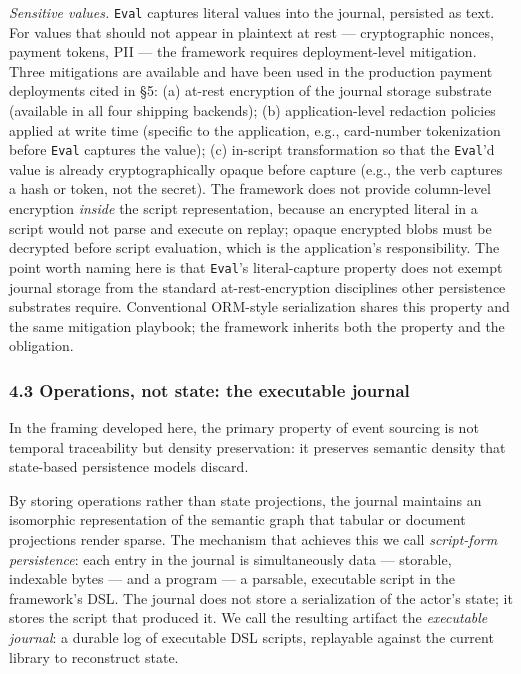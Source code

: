 \documentclass[
]{article}
\let\origtexttt\texttt%
\renewcommand{\texttt}[1]{\origtexttt{\seqsplit{#1}}}%
\let\texttt\origtexttt%
\begin{document}
\emph{Sensitive values.} \texttt{Eval} captures literal values into the
journal, persisted as text. For values that should not appear in
plaintext at rest --- cryptographic nonces, payment tokens, PII --- the
framework requires deployment-level mitigation. Three mitigations are
available and have been used in the production payment deployments cited
in §5: (a) at-rest encryption of the journal storage substrate
(available in all four shipping backends); (b) application-level
redaction policies applied at write time (specific to the application,
e.g., card-number tokenization before \texttt{Eval} captures the value);
(c) in-script transformation so that the \texttt{Eval}'d value is
already cryptographically opaque before capture (e.g., the verb captures
a hash or token, not the secret). The framework does not provide
column-level encryption \emph{inside} the script representation, because
an encrypted literal in a script would not parse and execute on replay;
opaque encrypted blobs must be decrypted before script evaluation, which
is the application's responsibility. The point worth naming here is that
\texttt{Eval}'s literal-capture property does not exempt journal storage
from the standard at-rest-encryption disciplines other persistence
substrates require. Conventional ORM-style serialization shares this
property and the same mitigation playbook; the framework inherits both
the property and the obligation.

\subsubsection{4.3 Operations, not state: the executable
journal}\label{operations-not-state-the-executable-journal}

In the framing developed here, the primary property of event sourcing is
not temporal traceability but density preservation: it preserves
semantic density that state-based persistence models discard.

By storing operations rather than state projections, the journal
maintains an isomorphic representation of the semantic graph that
tabular or document projections render sparse. The mechanism that
achieves this we call \emph{script-form persistence}: each entry in the
journal is simultaneously data --- storable, indexable bytes --- and a
program --- a parsable, executable script in the framework's DSL. The
journal does not store a serialization of the actor's state; it stores
the script that produced it. We call the resulting artifact the
\emph{executable journal}: a durable log of executable DSL scripts,
replayable against the current library to reconstruct state.
\end{document}
